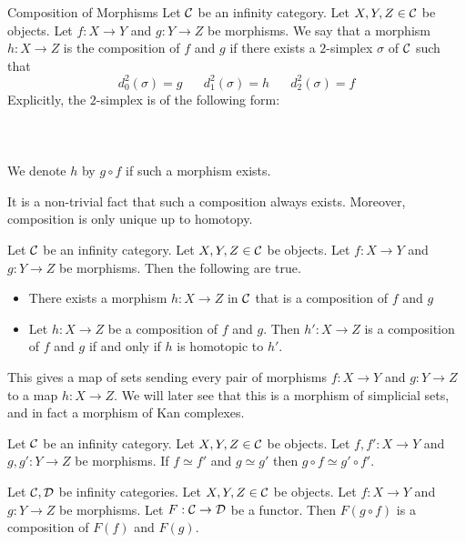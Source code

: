 \documentclass[a4paper]{article}
\begin{document}
\begin{defn}{Composition of Morphisms}{} Let $\mathcal{C}$ be an infinity category. Let $X,Y,Z\in\mathcal{C}$ be objects. Let $f:X\to Y$ and $g:Y\to Z$ be morphisms. We say that a morphism $h:X\to Z$ is the composition of $f$ and $g$ if there exists a $2$-simplex $\sigma$ of $\mathcal{C}$ such that $$d_0^2(\sigma)=g\;\;\;\;\;\;d_1^2(\sigma)=h\;\;\;\;\;\;d_2^2(\sigma)=f$$ Explicitly, the $2$-simplex is of the following form: \\~\\
\\~\\
We denote $h$ by $g\circ f$ if such a morphism exists. 
\end{defn}

It is a non-trivial fact that such a composition always exists. Moreover, composition is only unique up to homotopy. 

\begin{prp}{}{} Let $\mathcal{C}$ be an infinity category. Let $X,Y,Z\in\mathcal{C}$ be objects. Let $f:X\to Y$ and $g:Y\to Z$ be morphisms. Then the following are true. 
\begin{itemize}
\item There exists a morphism $h:X\to Z$ in $\mathcal{C}$ that is a composition of $f$ and $g$
\item Let $h:X\to Z$ be a composition of $f$ and $g$. Then $h':X\to Z$ is a composition of $f$ and $g$ if and only if $h$ is homotopic to $h'$. 
\end{itemize}
\end{prp}

This gives a map of sets sending every pair of morphisms $f:X\to Y$ and $g:Y\to Z$ to a map $h:X\to Z$. We will later see that this is a morphism of simplicial sets, and in fact a morphism of Kan complexes. 

\begin{prp}{}{} Let $\mathcal{C}$ be an infinity category. Let $X,Y,Z\in\mathcal{C}$ be objects. Let $f,f':X\to Y$ and $g,g':Y\to Z$ be morphisms. If $f\simeq f'$ and $g\simeq g'$ then $g\circ f\simeq g'\circ f'$. 
\end{prp}

\begin{lmm}{}{} Let $\mathcal{C},\mathcal{D}$ be infinity categories. Let $X,Y,Z\in\mathcal{C}$ be objects. Let $f:X\to Y$ and $g:Y\to Z$ be morphisms. Let $F:\mathcal{C}\to\mathcal{D}$ be a functor. Then $F(g\circ f)$ is a composition of $F(f)$ and $F(g)$. 
\end{lmm}
\end{document}
